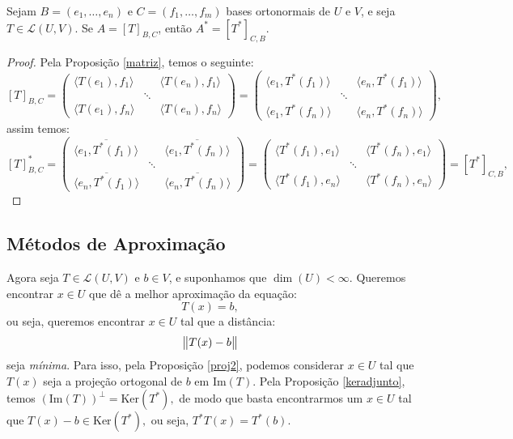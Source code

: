 \documentclass[11pt,twoside,a4paper]{book}
\begin{document}
\begin{teorema}
Sejam $B=(e_1,\dots,e_n)$ e $C=(f_1,\dots,f_m)$ bases ortonormais de $U$ e $V$, e seja $T\in\mathcal{L}(U,V)$. Se $A=[T]_{B,C}$, então $A^*=[T^*]_{C,B}$.
\end{teorema}
\begin{proof}
Pela Proposição \ref{matriz}, temos o seguinte:
\[
[T]_{B,C}=\begin{pmatrix}
\langle T(e_1),f_1\rangle&&\langle T(e_n),f_1\rangle\\&\ddots&\\\langle T(e_1),f_n\rangle&&\langle T(e_n),f_n\rangle
\end{pmatrix}=\begin{pmatrix}
\langle e_1,T^*(f_1)\rangle&&\langle e_n,T^*(f_1)\rangle\\&\ddots&\\\langle e_1,T^*(f_n)\rangle&&\langle e_n,T^*(f_n)\rangle
\end{pmatrix},
\]
assim temos:
\[
[T]_{B,C}^*=\begin{pmatrix}
\overline{\langle e_1,T^*(f_1)\rangle}&&\overline{\langle e_1,T^*(f_n)\rangle}\\&\ddots&\\\overline{\langle e_n,T^*(f_1)\rangle}&&\overline{\langle e_n,T^*(f_n)\rangle}
\end{pmatrix}=\begin{pmatrix}
\langle T^*(f_1),e_1\rangle&&\langle T^*(f_n),e_1\rangle\\&\ddots&\\\langle T^*(f_1),e_n\rangle&&\langle T^*(f_n),e_n\rangle
\end{pmatrix}=[T^*]_{C,B},
\]
\end{proof}

\subsection{Métodos de Aproximação}

Agora seja $T\in\mathcal{L}(U,V)$ e $b\in V$, e suponhamos que $\dim(U)<\infty.$ Queremos encontrar $x\in U$ que dê a melhor aproximação da equação:
\[
T(x)=b,
\]
ou seja, queremos encontrar $x\in U$ tal que a distância:
\[
\norm{T(x)-b}
\]
seja \emph{mínima}. Para isso, pela Proposição \ref{proj2}, podemos considerar $x\in U$ tal que $T(x)$ seja a projeção ortogonal de $b$ em $\mathrm{Im}(T).$ Pela Proposição \ref{keradjunto}, temos $(\mathrm{Im}(T))^\perp=\mathrm{Ker}(T^*),$ de modo que basta encontrarmos um $x\in U$ tal que $T(x)-b\in\mathrm{Ker}(T^*),$ ou seja, $T^*T(x)=T^*(b).$
\end{document}
